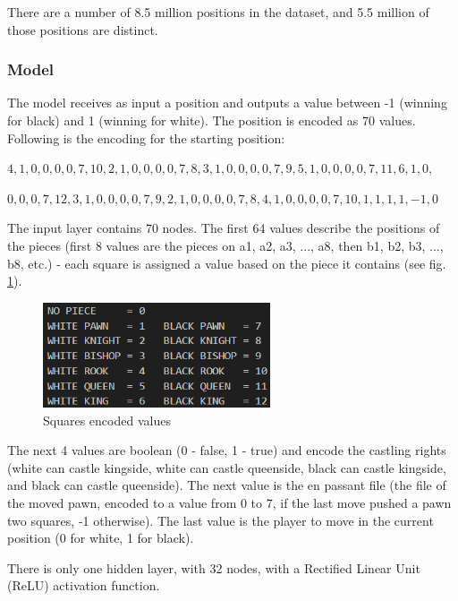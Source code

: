 
There are a number of 8.5 million positions in the dataset, and 5.5 million of those positions are distinct.

\subsubsection{Model}
\label{subsec:ch4sec3subsec2subsubsec2}

The model receives as input a position and outputs a value between -1 (winning for black) and 1 (winning for white). The position is encoded as 70 values. Following is the encoding for the starting position:

$4,1,0,0,0,0,7,10,2,1,0,0,0,0,7,8,3,1,0,0,0,0,7,9,5,1,0,0,0,0,7,11,6,1,0,$

$0,0,0,7,12,3,1,0,0,0,0,7,9,2,1,0,0,0,0,7,8,4,1,0,0,0,0,7,10,1,1,1,1,-1,0$

The input layer contains 70 nodes. The first 64 values describe the positions of the pieces (first 8 values are the pieces on a1, a2, a3, ..., a8, then b1, b2, b3, ..., b8, etc.) - each square is assigned a value based on the piece it contains (see fig. \ref{fig:squaresEncodedValues}).

\begin{figure}[h]
    \centering
    \includegraphics[width=0.6\textwidth]{figures/squares-encoded-values.png}
    \caption{Squares encoded values}
    \label{fig:squaresEncodedValues}
\end{figure}

The next 4 values are boolean (0 - false, 1 - true) and encode the castling rights (white can castle kingside, white can castle queenside, black can castle kingside, and black can castle queenside). The next value is the en passant file (the file of the moved pawn, encoded to a value from 0 to 7, if the last move pushed a pawn two squares, -1 otherwise). The last value is the player to move in the current position (0 for white, 1 for black).

There is only one hidden layer, with 32 nodes, with a Rectified Linear Unit (ReLU) activation function.

